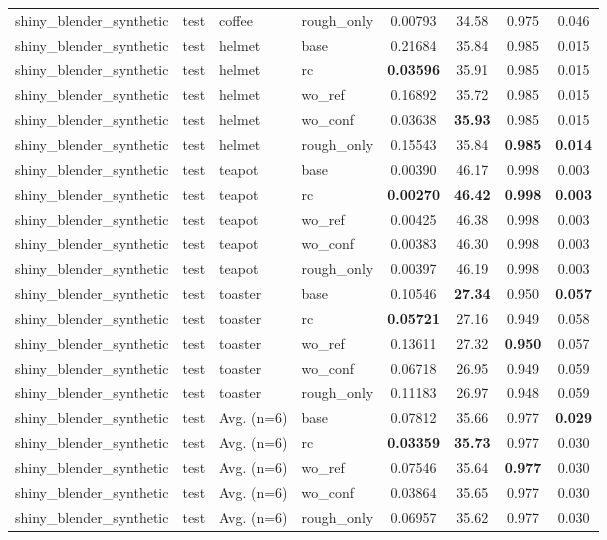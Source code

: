 \begin{table}[t]
{\begin{tabular}{llllcccc}
shiny\_blender\_synthetic & test & coffee & rough\_only & 0.00793 & 34.58 & 0.975 & 0.046 \\
shiny\_blender\_synthetic & test & helmet & base & 0.21684 & 35.84 & 0.985 & 0.015 \\
shiny\_blender\_synthetic & test & helmet & rc & \textbf{0.03596} & 35.91 & 0.985 & 0.015 \\
shiny\_blender\_synthetic & test & helmet & wo\_ref & 0.16892 & 35.72 & 0.985 & 0.015 \\
shiny\_blender\_synthetic & test & helmet & wo\_conf & 0.03638 & \textbf{35.93} & 0.985 & 0.015 \\
shiny\_blender\_synthetic & test & helmet & rough\_only & 0.15543 & 35.84 & \textbf{0.985} & \textbf{0.014} \\
shiny\_blender\_synthetic & test & teapot & base & 0.00390 & 46.17 & 0.998 & 0.003 \\
shiny\_blender\_synthetic & test & teapot & rc & \textbf{0.00270} & \textbf{46.42} & \textbf{0.998} & \textbf{0.003} \\
shiny\_blender\_synthetic & test & teapot & wo\_ref & 0.00425 & 46.38 & 0.998 & 0.003 \\
shiny\_blender\_synthetic & test & teapot & wo\_conf & 0.00383 & 46.30 & 0.998 & 0.003 \\
shiny\_blender\_synthetic & test & teapot & rough\_only & 0.00397 & 46.19 & 0.998 & 0.003 \\
shiny\_blender\_synthetic & test & toaster & base & 0.10546 & \textbf{27.34} & 0.950 & \textbf{0.057} \\
shiny\_blender\_synthetic & test & toaster & rc & \textbf{0.05721} & 27.16 & 0.949 & 0.058 \\
shiny\_blender\_synthetic & test & toaster & wo\_ref & 0.13611 & 27.32 & \textbf{0.950} & 0.057 \\
shiny\_blender\_synthetic & test & toaster & wo\_conf & 0.06718 & 26.95 & 0.949 & 0.059 \\
shiny\_blender\_synthetic & test & toaster & rough\_only & 0.11183 & 26.97 & 0.948 & 0.059 \\
shiny\_blender\_synthetic & test & Avg. (n=6) & base & 0.07812 & 35.66 & 0.977 & \textbf{0.029} \\
shiny\_blender\_synthetic & test & Avg. (n=6) & rc & \textbf{0.03359} & \textbf{35.73} & 0.977 & 0.030 \\
shiny\_blender\_synthetic & test & Avg. (n=6) & wo\_ref & 0.07546 & 35.64 & \textbf{0.977} & 0.030 \\
shiny\_blender\_synthetic & test & Avg. (n=6) & wo\_conf & 0.03864 & 35.65 & 0.977 & 0.030 \\
shiny\_blender\_synthetic & test & Avg. (n=6) & rough\_only & 0.06957 & 35.62 & 0.977 & 0.030 \\
\bottomrule
\end{tabular}}
\end{table}
